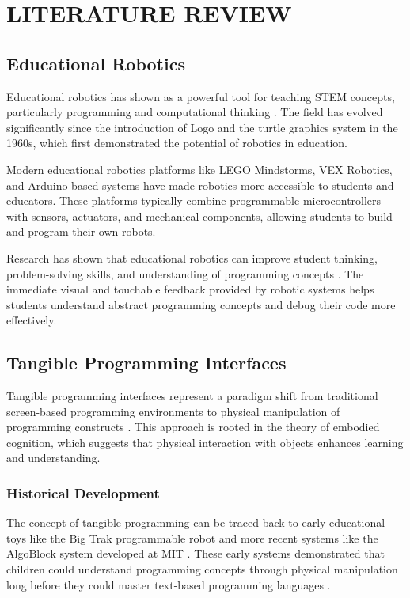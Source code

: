 \chapter{LITERATURE REVIEW}

\section{Educational Robotics}

Educational robotics has shown as a powerful tool for teaching STEM concepts, particularly programming and computational thinking \cite{benitti2012exploring}. The field has evolved significantly since the introduction of Logo and the turtle graphics system in the 1960s, which first demonstrated the potential of robotics in education.

Modern educational robotics platforms like LEGO Mindstorms, VEX Robotics, and Arduino-based systems have made robotics more accessible to students and educators.\cite{papert1980mindstorms} These platforms typically combine programmable microcontrollers with sensors, actuators, and mechanical components, allowing students to build and program their own robots.

Research has shown that educational robotics can improve student thinking, problem-solving skills, and understanding of programming concepts  \cite{sullivan2013robots}. The immediate visual and touchable feedback provided by robotic systems helps students understand abstract programming concepts and debug their code more effectively.

\section{Tangible Programming Interfaces}

Tangible programming interfaces represent a paradigm shift from traditional screen-based programming environments to physical manipulation of programming constructs \cite{ishii2008tangible}. This approach is rooted in the theory of embodied cognition, which suggests that physical interaction with objects enhances learning and understanding.

\subsection{Historical Development}
The concept of tangible programming can be traced back to early educational toys like the Big Trak programmable robot and more recent systems like the AlgoBlock system developed at MIT \cite{bau2009alphablocks}. These early systems demonstrated that children could understand programming concepts through physical manipulation long before they could master text-based programming languages \cite{suzuki1999interaction}.

